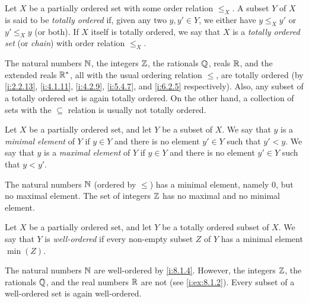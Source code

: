 \begin{defn}\label{i:8.5.3}
  Let \(X\) be a partially ordered set with some order relation \(\leq_X\).
  A subset \(Y\) of \(X\) is said to be \emph{totally ordered} if, given any two \(y, y' \in Y\), we either have \(y \leq_X y'\) or \(y' \leq_X y\) (or both).
  If \(X\) itself is totally ordered, we say that \(X\) is a \emph{totally ordered set} (or \emph{chain}) with order relation \(\leq_X\).
\end{defn}

\begin{eg}\label{i:8.5.4}
  The natural numbers \(\mathbb{N}\), the integers \(\mathbb{Z}\), the rationals \(\mathbb{Q}\), reals \(\mathbb{R}\), and the extended reals \(\mathbb{R}^*\), all with the usual ordering relation \(\leq\), are totally ordered
  (by \cref{i:2.2.13}, \cref{i:4.1.11}, \cref{i:4.2.9}, \cref{i:5.4.7}, and \cref{i:6.2.5} respectively).
  Also, any subset of a totally ordered set is again totally ordered. On the other hand, a collection of sets with the \(\subseteq\) relation is usually not totally ordered.
\end{eg}

\begin{defn}\label{i:8.5.5}
  Let \(X\) be a partially ordered set, and let \(Y\) be a subset of \(X\).
  We say that \(y\) is a \emph{minimal element} of \(Y\) if \(y \in Y\) and there is no element \(y' \in Y\) such that \(y' < y\).
  We say that \(y\) is a \emph{maximal element} of \(Y\) if \(y \in Y\) and there is no element \(y' \in Y\) such that \(y < y'\).
\end{defn}

\setcounter{thm}{6}
\begin{eg}\label{i:8.5.7}
  The natural numbers \(\mathbb{N}\) (ordered by \(\leq\)) has a minimal element, namely \(0\), but no maximal element.
  The set of integers \(\mathbb{Z}\) has no maximal and no minimal element.
\end{eg}

\begin{defn}\label{i:8.5.8}
  Let \(X\) be a partially ordered set, and let \(Y\) be a totally ordered subset of \(X\).
  We say that \(Y\) is \emph{well-ordered} if every non-empty subset \(Z\) of \(Y\) has a minimal element \(\min(Z)\).
\end{defn}

\begin{eg}\label{i:8.5.9}
  The natural numbers \(\mathbb{N}\) are well-ordered by \cref{i:8.1.4}.
  However, the integers \(\mathbb{Z}\), the rationals \(\mathbb{Q}\), and the real numbers \(\mathbb{R}\) are not (see \cref{i:ex:8.1.2}).
  Every subset of a well-ordered set is again well-ordered.
\end{eg}

